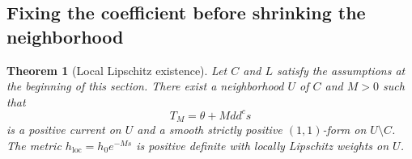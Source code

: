 \documentclass[11pt,a4paper]{article}
\numberwithin{equation}{section}
\newtheorem{theorem}{Theorem}[section]
\theoremstyle{definition}
\theoremstyle{remark}
\newcommand{\ddc}{dd^{c}}
\begin{document}
\subsection{Fixing the coefficient before shrinking the neighborhood}

\begin{theorem}[Local Lipschitz existence]
\label{met:lipschitz-local}
Let $C$ and $L$ satisfy the assumptions at the beginning of this
section. There exist a neighborhood $U$ of $C$ and $M>0$ such that
\begin{equation}\label{met:local-current}
                    T_M=\theta+M\ddc s
\end{equation}
is a positive current on $U$ and a smooth strictly positive
$(1,1)$-form on $U\setminus C$. The metric
$h_{\mathrm{loc}}=h_0e^{-Ms}$ is positive definite with locally
Lipschitz weights on $U$.
\end{theorem}
\end{document}
